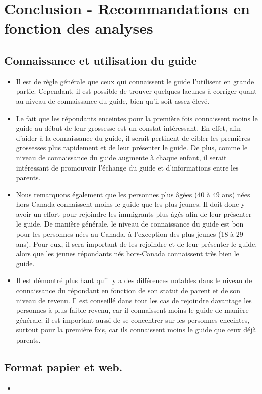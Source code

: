 \documentclass[
]{article}
\providecommand{\tightlist}{%
  \setlength{\itemsep}{0pt}\setlength{\parskip}{0pt}}
\begin{document}
\newpage

\hypertarget{conclusion---recommandations-en-fonction-des-analyses}{%
\section{Conclusion - Recommandations en fonction des
analyses}\label{conclusion---recommandations-en-fonction-des-analyses}}

\hypertarget{connaissance-et-utilisation-du-guide}{%
\subsection{Connaissance et utilisation du
guide}\label{connaissance-et-utilisation-du-guide}}

\begin{itemize}
\tightlist
\item
  Il est de règle générale que ceux qui connaissent le guide l'utilisent
  en grande partie. Cependant, il est possible de trouver quelques
  lacunes à corriger quant au niveau de connaissance du guide, bien
  qu'il soit assez élevé.
\item
  Le fait que les répondants enceintes pour la première fois connaissent
  moins le guide au début de leur grossesse est un constat intéressant.
  En effet, afin d'aider à la connaissance du guide, il serait pertinent
  de cibler les premières grossesses plus rapidement et de leur
  présenter le guide. De plus, comme le niveau de connaissance du guide
  augmente à chaque enfant, il serait intéressant de promouvoir
  l'échange du guide et d'informations entre les parents.
\item
  Nous remarquons également que les personnes plus âgées (40 à 49 ans)
  nées hors-Canada connaissent moins le guide que les plus jeunes. Il
  doit donc y avoir un effort pour rejoindre les immigrants plus âgés
  afin de leur présenter le guide. De manière générale, le niveau de
  connaissance du guide est bon pour les personnes nées au Canada, à
  l'exception des plus jeunes (18 à 29 ans). Pour eux, il sera important
  de les rejoindre et de leur présenter le guide, alors que les jeunes
  répondants nés hors-Canada connaissent très bien le guide.
\item
  Il est démontré plus haut qu'il y a des différences notables dans le
  niveau de connaissance du répondant en fonction de son statut de
  parent et de son niveau de revenu. Il est conseillé dans tout les cas
  de rejoindre davantage les personnes à plus faible revenu, car il
  connaissent moins le guide de manière générale. il est important aussi
  de se concentrer sur les personnes enceintes, surtout pour la première
  fois, car ils connaissent moins le guide que ceux déjà parents.
\end{itemize}

\hypertarget{format-papier-et-web.}{%
\subsection{Format papier et web.}\label{format-papier-et-web.}}

\begin{itemize}
\tightlist
\item
\end{itemize}
\end{document}
